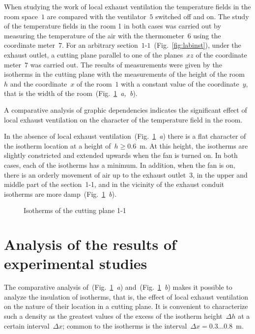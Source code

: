 \documentclass[12pt,twoside]{article}
\newcommand{\FigRef}[2][]{(Fig.~\ref{#2}\textit{#1})}
\begin{document}
\begin{JGGarticle}
			When studying the work of local exhaust ventilation the temperature fields in the room space~$1$ are compared with the ventilator~$5$ switched off and on. The study of the temperature fields in the room 1 in both cases was carried out by measuring the temperature of the air with the thermometer~$6$ using the coordinate meter~$7$. For an arbitrary section~$1\text{-}1$~\FigRef{fig:labinst}, under the exhaust outlet, a cutting plane parallel to one of the planes~$xz$ of the coordinate meter~$7$ was carried out. The results of measurements were given by the isotherms in the cutting plane with the measurements of the height of the room~$h$ and the coordinate~$x$ of the room~$1$ with a constant value of the coordinate~$y$, that is the width of the room~\FigRef[~a,~b]{fig:isothrm_1-1}.
			
			A comparative analysis of graphic dependencies indicates the significant effect of local exhaust ventilation on the character of the temperature field in the room.
			
			In the absence of local exhaust ventilation~\FigRef[~a]{fig:isothrm_1-1} there is a flat character of the isotherm location at a height of~$h \geq 0.6$~m. At this height, the isotherms are slightly constricted and extended upwards when the fan is turned on. In both cases, each of the isotherms has a minimum. In addition, when the fan is on, there is an orderly movement of air up to the exhaust outlet~$3$, in the upper and middle part of the section~1-1, and in the vicinity of the exhaust conduit isotherms are more damp~\FigRef[~b]{fig:isothrm_1-1}.
			\begin{figure}[!hbt]
				\caption{Isotherms of the cutting plane 1-1}
				\label{fig:isothrm_1-1}
			\end{figure}
		\section{Analysis of the results of experimental studies}
			The comparative analysis of~\FigRef[~a]{fig:isothrm_1-1} and~\FigRef[~b]{fig:isothrm_1-1} makes it possible to analyze the insulation of isotherms, that is, the effect of local exhaust ventilation on the nature of their location in a cutting plane. It is convenient to characterize such a density as the greatest values of the excess of the isotherm height~$\Delta h$ at a certain interval~$\Delta x$; common to the isotherms is the interval~$\Delta x = 0.3 \dotso 0.8$~m.
			

\end{JGGarticle}
\end{document}
